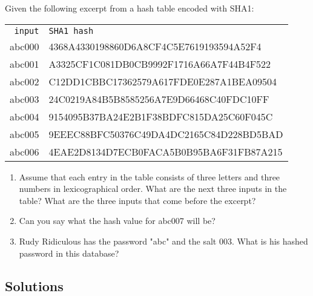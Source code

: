 \documentclass[11pt,a4paper]{report}
\begin{document}
\begin{ex}
Given the following excerpt from a hash table encoded with  SHA1:

\begin{tabular}{rl}
\texttt{input} & \texttt{SHA1 hash} \\
abc000 & 4368A4330198860D6A8CF4C5E7619193594A52F4 \\
abc001 & A3325CF1C081DB0CB9992F1716A66A7F44B4F522 \\
abc002 & C12DD1CBBC17362579A617FDE0E287A1BEA09504 \\
abc003 & 24C0219A84B5B8585256A7E9D66468C40FDC10FF \\ 
abc004 & 9154095B37BA24E2B1F38BDFC815DA25C60F045C \\
abc005 & 9EEEC88BFC50376C49DA4DC2165C84D228BD5BAD \\
abc006 & 4EAE2D8134D7ECB0FACA5B0B95BA6F31FB87A215 
\end{tabular}

\begin{enumerate}
\item Assume that each entry in the table consists of three letters and three numbers in lexicographical order. What are the next three inputs in the table? What are the three inputs that come before the excerpt?
\item Can you say what the hash value for abc007 will be?
\item Rudy Ridiculous has the password "abc" and the salt $003$. What is his hashed password in this database?
\end{enumerate}
\end{ex}

%
%
%
%
%
%
%
%
%

\subsection{Solutions}
\printcursols
\end{document}
